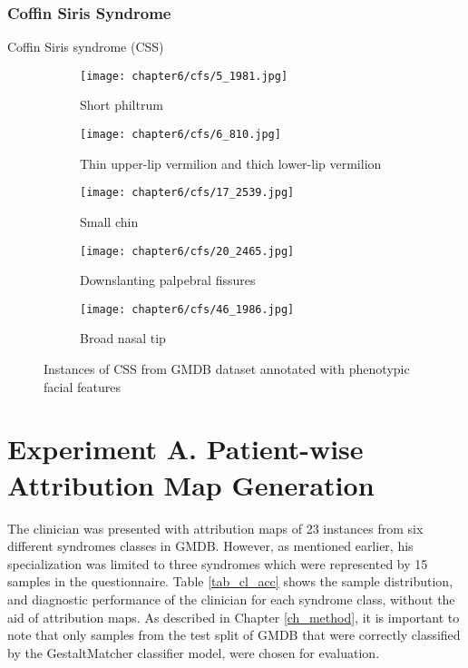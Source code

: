 \documentclass[../report.tex]{subfiles}
\begin{document}
	 	\subsubsection{Coffin Siris Syndrome}
	 	Coffin Siris syndrome (CSS)
	 \begin{figure}[H]\label{fig_cfs}
	 	\centering
	 	\begin{subfigure}[t]{0.17\textwidth}
	 		\centering
	 		\texttt{[image: chapter6/cfs/5\_1981.jpg]}
	 		\caption{Short philtrum}
	 	\end{subfigure}
	 	\begin{subfigure}[t]{0.17\textwidth}
	 		\centering
	 		\texttt{[image: chapter6/cfs/6\_810.jpg]}
	 		\caption{Thin upper-lip vermilion and thich lower-lip vermilion }
	 	\end{subfigure}	
	 	\begin{subfigure}[t]{0.17\textwidth}
	 		\centering
	 		\texttt{[image: chapter6/cfs/17\_2539.jpg]}
	 		\caption{Small chin}
	 	\end{subfigure}	
	 	\begin{subfigure}[t]{0.17\textwidth}
	 		\centering
	 		\texttt{[image: chapter6/cfs/20\_2465.jpg]}
	 		\caption{Downslanting palpebral fissures}
	 	\end{subfigure}	
	 	\begin{subfigure}[t]{0.17\textwidth}
	 		\centering
	 		\texttt{[image: chapter6/cfs/46\_1986.jpg]}
	 		\caption{Broad nasal tip}
	 	\end{subfigure}	
	 	\caption[Instances of HPMRS from GMDB dataset]{Instances of CSS from GMDB dataset annotated with phenotypic facial features}
	 \end{figure}
	 
	 
    \section{Experiment A. Patient-wise Attribution Map Generation}
    The clinician was presented with attribution maps of 23 instances from six different syndromes classes in GMDB. However, as mentioned earlier, his specialization was limited to three syndromes which were represented by 15 samples in the questionnaire. Table \ref{tab_cl_acc} shows the sample distribution, and diagnostic performance of the clinician for each syndrome class, without the aid of attribution maps. As described in  Chapter \ref{ch_method}, it is important to note that only samples from the test split of GMDB that were correctly classified by the GestaltMatcher classifier model, were chosen for evaluation. 
    
\end{document}
